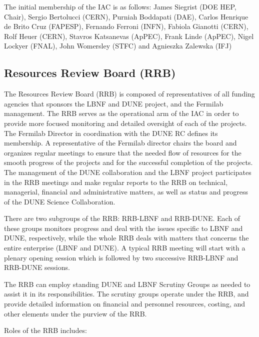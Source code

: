 The initial membership of the IAC is as follows:
James Siegrist (DOE HEP, Chair),
Sergio Bertolucci (CERN),
Purniah Boddapati (DAE),
Carlos Henrique de Brito Cruz (FAPESP),
Fernando Ferroni (INFN),
Fabiola Gianotti (CERN),
Rolf Heuer (CERN),
Stavros Katsanevas (ApPEC),
Frank Linde (ApPEC),
Nigel Lockyer (FNAL),
John Womersley (STFC) and
Agnieszka Zalewska (IFJ)

\subsection{Resources Review Board (RRB)}

The Resources Review Board (RRB) is composed of representatives of all
funding agencies that sponsors the LBNF and DUNE project, and the Fermilab
management. The RRB serves as the operational arm of the IAC
in order to provide more focused monitoring and detailed oversight
of each of the projects. The Fermilab Director in coordination
with the DUNE RC defines its membership. A representative of the
Fermilab director chairs the board and
organizes regular meetings to ensure that the needed flow of resources
for the smooth progress of the projects and for the successful completion
of the projects. The management of the
DUNE collaboration and the LBNF project participates in the RRB meetings
and make regular reports to the RRB on technical, managerial,
financial and administrative matters, as well as status and
progress of the DUNE Science Collaboration.

There are two subgroups of the RRB: RRB-LBNF and RRB-DUNE. Each of
these groups monitors progress and deal with the issues specific to
LBNF and DUNE, respectively, while the whole RRB deals with matters
that concerns the entire enterprise (LBNF and DUNE). A typical RRB meeting
will start with a plenary opening session which is followed by two
successive RRB-LBNF and RRB-DUNE sessions.

The RRB can employ standing DUNE and LBNF Scrutiny Groups as needed
to assist it in its responsibilities. The scrutiny groups operate
under the RRB, and provide detailed information on financial and
personnel resources, costing, and other elements under the purview of the RRB.

Roles of the RRB includes:

